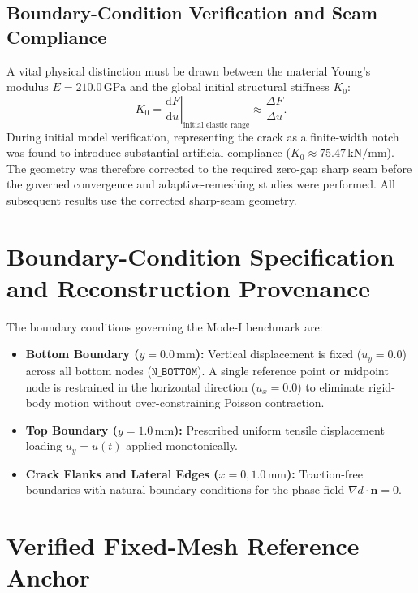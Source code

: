 \subsection{Boundary-Condition Verification and Seam Compliance}
\label{sec:notch_vs_seam}

A vital physical distinction must be drawn between the material Young's modulus $E = 210.0\,\mathrm{GPa}$ and the global initial structural stiffness $K_0$:
\begin{equation}
  K_0 = \left. \frac{\mathrm{d}F}{\mathrm{d}u} \right|_{\text{initial elastic range}} \approx \frac{\Delta F}{\Delta u}.
  \label{eq:k0_definition}
\end{equation}
During initial model verification, representing the crack as a finite-width notch was found to introduce substantial artificial compliance ($K_0 \approx 75.47\,\mathrm{kN/mm}$). The geometry was therefore corrected to the required zero-gap sharp seam before the governed convergence and adaptive-remeshing studies were performed. All subsequent results use the corrected sharp-seam geometry.

\section{Boundary-Condition Specification and Reconstruction Provenance}
\label{sec:boundary_conditions}

The boundary conditions governing the Mode-I benchmark are:
\begin{itemize}
  \item \textbf{Bottom Boundary ($y = 0.0\,\mathrm{mm}$):} Vertical displacement is fixed ($u_y = 0.0$) across all bottom nodes ($\mathtt{N\_BOTTOM}$). A single reference point or midpoint node is restrained in the horizontal direction ($u_x = 0.0$) to eliminate rigid-body motion without over-constraining Poisson contraction.
  \item \textbf{Top Boundary ($y = 1.0\,\mathrm{mm}$):} Prescribed uniform tensile displacement loading $u_y = u(t)$ applied monotonically.
  \item \textbf{Crack Flanks and Lateral Edges ($x = 0, 1.0\,\mathrm{mm}$):} Traction-free boundaries with natural boundary conditions for the phase field $\nabla d \cdot \mathbf{n} = 0$.
\end{itemize}

\section{Verified Fixed-Mesh Reference Anchor}
\label{sec:fixed_reference_anchor}

